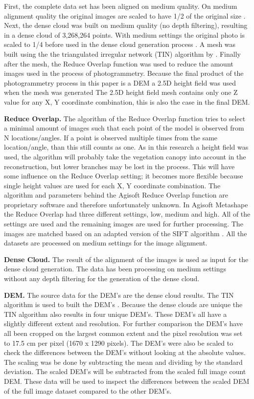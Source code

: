 \documentclass{isprs} %
\begin{document}
First, the complete data set has been aligned on medium quality.
On medium alignment quality the original images are scaled to have 1/2 of the original size \citep{manual}.
Next, the dense cloud was built on medium quality (no depth filtering), resulting in a dense cloud of 3,268,264 points.
With medium settings the original photo is scaled to 1/4 before used in the dense cloud generation process \citep{manual}.
A mesh was built using the the triangulated irregular network (TIN) algorithm by \citet{axelsson1999processing}. 
Finally after the mesh, the Reduce Overlap function was used to reduce the amount images used in the process of photogrammetry. 
Because the final product of the photogrammetry process in this paper is a DEM a 2.5D height field was used when the mesh was generated
The 2.5D height field mesh contains only one Z value for any X, Y coordinate combination, this is also the case in the final DEM.

\textbf{Reduce Overlap.} 
The algorithm of the Reduce Overlap function tries to select a minimal amount of images such that each point of the model is observed from N locations/angles.
If a point is observed multiple times from the same location/angle, than this still counts as one. 
As in this research a height field was used, the algorithm will probably take the vegetation canopy into account in the reconstruction, but lower branches may be lost in the process.
This will have some influence on the Reduce Overlap setting; it becomes more flexible because single height values are used for each X, Y coordinate combination.
The algorithm and parameters behind the Agisoft Reduce Overlap function are proprietary software and therefore unfortunately unknown.
In Agisoft Metashape the Reduce Overlap had three different settings, low, medium and high. 
All of the settings are used and the remaining images are used for further processing.
The images are matched based on an adapted version of the SIFT algorithm \citep{lowe1999object, AgisoftMetashape}.
All the datasets are processed on medium settings for the image alignment.

\textbf{Dense Cloud.}
The result of the alignment of the images is used as input for the dense cloud generation.
The data has been processing on medium settings without any depth filtering for the generation of the dense cloud. 

\textbf{DEM.}
The source data for the DEM's are the dense cloud results. 
The TIN algorithm is used to built the DEM's \citep{axelsson1999processing}.
Because the dense clouds are unique the TIN algorithm also results in four unique DEM's.
These DEM's all have a slightly different extent and resolution.
For further comparison the DEM's have all been cropped on the largest common extent and the pixel resolution was set to 17.5 cm per pixel (1670 x 1290 pixels).
The DEM's were also be scaled to check the differences between the DEM's without looking at the absolute values.
The scaling was be done by subtracting the mean and dividing by the standard deviation.
The scaled DEM's will be subtracted from the scaled full image count DEM.
These data will be used to inspect the differences between the scaled DEM of the full image dataset compared to the other DEM's.
\end{document}
